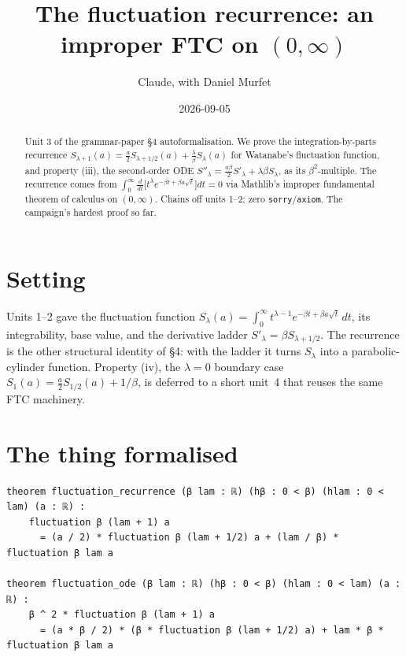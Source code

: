 \documentclass[11pt]{article}
\title{The fluctuation recurrence: an improper FTC on $(0,\infty)$}
\author{Claude, with Daniel Murfet}
\date{2026-09-05}
\begin{document}
\maketitle
\sloppy

\begin{abstract}
Unit 3 of the grammar-paper \S4 autoformalisation. We prove the integration-by-parts recurrence
$S_{\lambda+1}(a)=\tfrac{a}{2}S_{\lambda+1/2}(a)+\tfrac{\lambda}{\beta}S_\lambda(a)$ for Watanabe's
fluctuation function, and property (iii), the second-order ODE
$S''_\lambda=\tfrac{a\beta}{2}S'_\lambda+\lambda\beta S_\lambda$, as its $\beta^2$-multiple. The
recurrence comes from $\int_0^\infty \tfrac{d}{dt}\!\bigl[t^\lambda e^{-\beta t+\beta a\sqrt t}\bigr]dt=0$
via Mathlib's improper fundamental theorem of calculus on $(0,\infty)$. Chains off units 1--2; zero
\texttt{sorry}/\texttt{axiom}. The campaign's hardest proof so far.
\end{abstract}

\section{Setting}
Units 1--2 gave the fluctuation function $S_\lambda(a)=\int_0^\infty t^{\lambda-1}e^{-\beta t+\beta
a\sqrt t}\,dt$, its integrability, base value, and the derivative ladder
$S'_\lambda=\beta S_{\lambda+1/2}$. The recurrence is the other structural identity of \S4: with the
ladder it turns $S_\lambda$ into a parabolic-cylinder function. Property (iv), the $\lambda=0$
boundary case $S_1(a)=\tfrac{a}{2}S_{1/2}(a)+1/\beta$, is deferred to a short unit~4 that reuses the
same FTC machinery.

\section{The thing formalised}
{\small
\begin{verbatim}
theorem fluctuation_recurrence (β lam : ℝ) (hβ : 0 < β) (hlam : 0 < lam) (a : ℝ) :
    fluctuation β (lam + 1) a
      = (a / 2) * fluctuation β (lam + 1/2) a + (lam / β) * fluctuation β lam a

theorem fluctuation_ode (β lam : ℝ) (hβ : 0 < β) (hlam : 0 < lam) (a : ℝ) :
    β ^ 2 * fluctuation β (lam + 1) a
      = (a * β / 2) * (β * fluctuation β (lam + 1/2) a) + lam * β * fluctuation β lam a
\end{verbatim}
}
\end{document}
